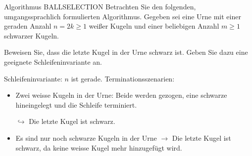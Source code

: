 \documentclass{article}
\begin{document}
\begin{exercise}{Algorithmus BALLSELECTION}
  Betrachten Sie den folgenden, umgangssprachlich formulierten Algorithmus. Gegeben sei eine Urne mit einer geraden Anzahl $n = 2k \ge 1$ weißer Kugeln und einer beliebigen Anzahl $m \geq 1$ schwarzer Kugeln.\par
  \begin{algorithm}[ht]
    \caption{BALLSELECTION}
  \end{algorithm}
  \noindent Beweisen Sie, dass die letzte Kugel in der Urne schwarz ist. Geben Sie dazu eine geeignete Schleifeninvariante an.

  \begin{solution}
    Schleifeninvariante: $n$ ist gerade. Terminationsszenarien:
    \begin{itemize}
      \item Zwei weisse Kugeln in der Urne: Beide werden gezogen, eine schwarze hineingelegt und die Schleife terminiert.\par $\hookrightarrow$ Die letzte Kugel ist schwarz.
      \item Es sind nur noch schwarze Kugeln in der Urne $\to$ Die letzte Kugel ist schwarz, da keine weisse Kugel mehr hinzugefügt wird.
    \end{itemize}
  \end{solution}
\end{exercise}
\end{document}
